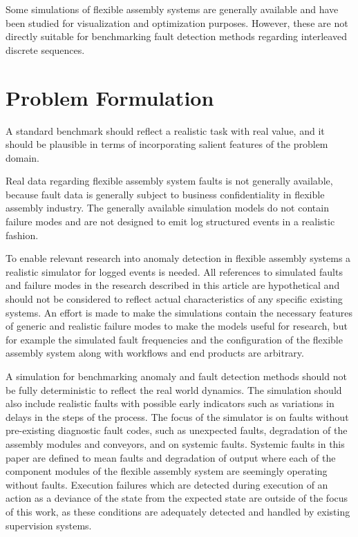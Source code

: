 \documentclass[procedia]{easychair}
\begin{document}
Some simulations of flexible assembly systems are generally available\cite{giulio}\cite{el1989simulation}\cite{donath1988flexible} and have been studied for visualization and optimization purposes.
However, these are not directly suitable for benchmarking fault detection methods regarding interleaved discrete sequences.

\section{Problem Formulation}

A standard benchmark should reflect a realistic task with real value, and it should be plausible in terms of incorporating salient features of the problem domain.

Real data regarding flexible assembly system faults is
not generally available, because fault data is generally subject to business confidentiality in flexible assembly industry.
The generally available simulation models do not contain failure modes and are not designed to emit
log structured events in a realistic fashion.

To enable relevant research into anomaly detection in flexible assembly systems a realistic simulator for logged events is needed.
All references to simulated faults and failure modes in the research described in this article are hypothetical and should not be considered to
reflect actual characteristics of any specific existing systems. An effort is made to make the simulations contain the necessary features of
generic and realistic failure modes to make the models useful for research, but for example the simulated fault frequencies and the configuration
of the flexible assembly system along with workflows and end products are arbitrary.

A simulation for benchmarking anomaly and fault detection methods should not be fully deterministic to reflect the real world dynamics. The simulation should also
include realistic faults with possible early indicators such as variations in delays in the steps of the process. The focus of the simulator is on faults without pre-existing
diagnostic fault codes, such as unexpected faults, degradation of the assembly modules and conveyors, and on systemic faults. Systemic faults in this paper
are defined to mean faults and degradation of output where each of the component modules of the flexible assembly system are seemingly operating without faults. Execution failures
which are detected during execution of an action as a deviance of the state from the expected state are outside of the focus of this work, as these conditions are adequately detected and handled
by existing supervision systems.
\end{document}
